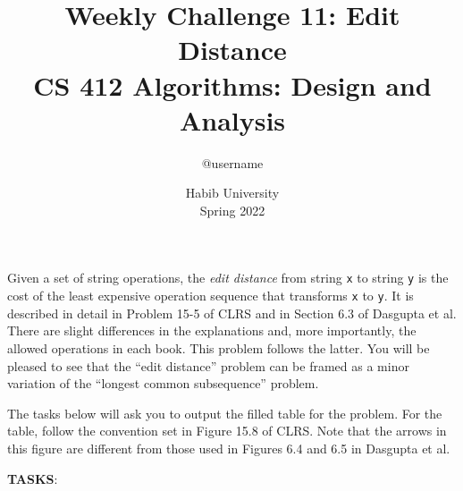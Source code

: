\documentclass[a4paper]{exam}
\title{Weekly Challenge 11: Edit Distance\\CS 412 Algorithms: Design and Analysis}
\author{@username}  %
\date{Habib University\\Spring 2022}
\begin{document}
\maketitle

\begin{questions}
  

  Given a set of string operations, the \textit{edit distance} from string \texttt{x} to string \texttt{y} is the cost of the least expensive operation sequence that transforms \texttt{x} to \texttt{y}. It is described in detail in Problem 15-5 of CLRS and in Section 6.3 of Dasgupta et al. There are slight differences in the explanations and, more importantly, the allowed operations in each book. This problem follows the latter. You will be pleased to see that the ``edit distance'' problem can be framed as a minor variation of the ``longest common subsequence'' problem.

  The tasks below will ask you to output the filled table for the problem. For the table, follow the convention set in Figure 15.8 of CLRS. Note that the arrows in this figure are different from those used in Figures 6.4 and 6.5 in Dasgupta et al. 

  \textbf{TASKS}:
 
  \begin{solution}
  \end{solution}
\end{questions}
\end{document}
